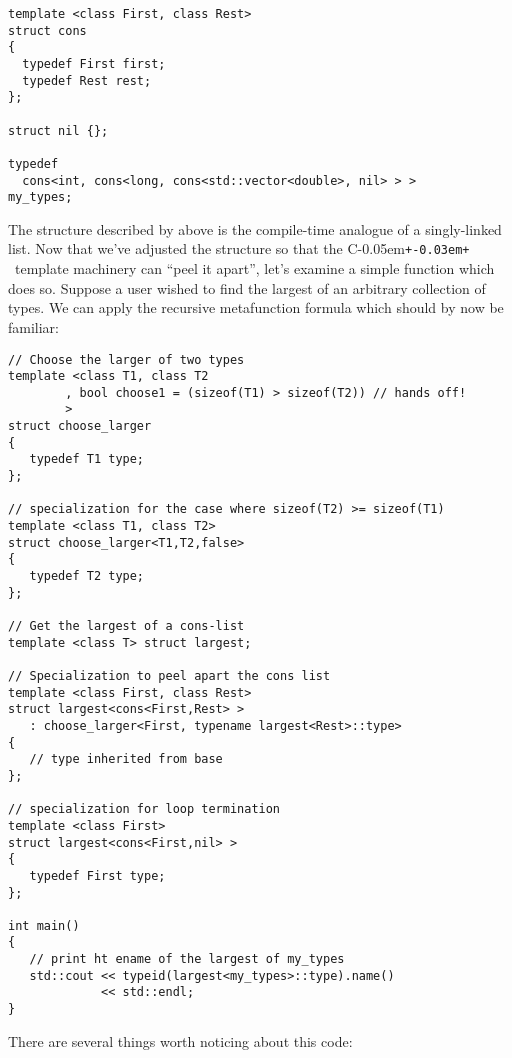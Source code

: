 \documentclass{netobjectdays}
\newcommand{\Cpp}{C\kern-0.05em\texttt{+\kern-0.03em+}%
}
\begin{document}
{\footnotesize
\begin{verbatim}
template <class First, class Rest>
struct cons
{
  typedef First first;
  typedef Rest rest;
};

struct nil {};

typedef
  cons<int, cons<long, cons<std::vector<double>, nil> > >
my_types;
\end{verbatim}
}

The structure described by  above is the compile-time
analogue of a singly-linked list. Now that we've adjusted the
structure so that the \Cpp\ template machinery can ``peel it apart'',
let's examine a simple function which does so. Suppose a user wished
to find the largest of an arbitrary collection of types. We can apply
the recursive metafunction formula which should by now be familiar:

{\footnotesize
\begin{verbatim}
// Choose the larger of two types
template <class T1, class T2
        , bool choose1 = (sizeof(T1) > sizeof(T2)) // hands off!
        >
struct choose_larger
{
   typedef T1 type;
};

// specialization for the case where sizeof(T2) >= sizeof(T1)
template <class T1, class T2>
struct choose_larger<T1,T2,false>
{
   typedef T2 type;
};

// Get the largest of a cons-list
template <class T> struct largest;

// Specialization to peel apart the cons list
template <class First, class Rest>
struct largest<cons<First,Rest> >
   : choose_larger<First, typename largest<Rest>::type>
{
   // type inherited from base
};

// specialization for loop termination
template <class First>
struct largest<cons<First,nil> >
{
   typedef First type;
};

int main()
{
   // print ht ename of the largest of my_types
   std::cout << typeid(largest<my_types>::type).name()
             << std::endl;
}

\end{verbatim}
}

There are several things worth noticing about this code:
\end{document}
